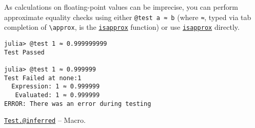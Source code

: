 As calculations on floating-point values can be imprecise, you can perform approximate equality checks using either \texttt{@test a ≈ b} (where \texttt{≈}, typed via tab completion of \texttt{{\textbackslash}approx}, is the \hyperlink{12499503887608197213}{\texttt{isapprox}} function) or use \hyperlink{12499503887608197213}{\texttt{isapprox}} directly.




\begin{verbatim}
julia> @test 1 ≈ 0.999999999
Test Passed

julia> @test 1 ≈ 0.999999
Test Failed at none:1
  Expression: 1 ≈ 0.999999
   Evaluated: 1 ≈ 0.999999
ERROR: There was an error during testing
\end{verbatim}


\hypertarget{14660196658788499514}{} 
\hyperlink{14660196658788499514}{\texttt{Test.@inferred}}  -- {Macro.}

